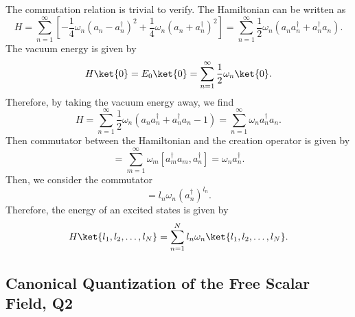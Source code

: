 \begin{solution}
    The commutation relation is trivial to verify. The Hamiltonian can be written as
    \begin{equation}
        H = \sum_{n=1}^\infty \left[-\frac{1}{4}\omega_n(a_n - a_n^\dagger)^2 + \frac{1}{4}\omega_n (a_n + a_n^\dagger)^2\right] = \sum_{n=1}^\infty\frac{1}{2}\omega_n(a_na_n^\dagger + a_n^\dagger a_n).
    \end{equation}
    The vacuum energy is given by 
    \begin{equation}
        H\ket{0} = E_0\ket{0} = \sum^\infty_{n=1}\frac{1}{2}\omega_n \ket{0}.
    \end{equation}
    Therefore, by taking the vacuum energy away, we find
    \begin{equation}
        H = \sum_{n=1}^\infty\frac{1}{2}\omega_n(a_na_n^\dagger + a_n^\dagger a_n -1) = \sum_{n=1}^\infty\omega_na_n^\dagger a_n.
    \end{equation}
    Then commutator between the Hamiltonian and the creation operator is given by
    \begin{equation}
        [H,a_n^\dagger] = \sum_{m=1}^\infty\omega_m [a_m^\dagger a_m, a_n^\dagger] = \omega_n a_n^\dagger.
    \end{equation}
    Then, we consider the commutator
    \begin{equation}
        [H, (a_n^\dagger)^{l_n}] = l_n\omega_n(a_n^\dagger)^{l_n}.
    \end{equation}
    Therefore, the energy of an excited states is given by
    \begin{equation}
        H\ket{l_1,l_2,\dots,l_N} = \sum_{n=1}^Nl_n\omega_n\ket{l_1,l_2,\dots,l_N}.
    \end{equation}
\end{solution}

\subsection{Canonical Quantization of the Free Scalar Field, Q2}

